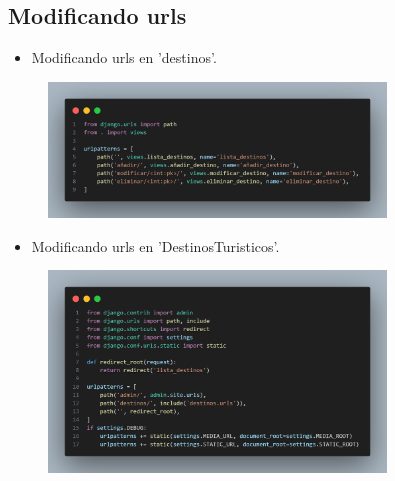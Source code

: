 \documentclass{article}
\begin{document}
	\subsection{Modificando urls}
    \begin{itemize}
		\item Modificando urls en 'destinos'.
	\end{itemize}
	\begin{figure}[H]
		\centering
		\includegraphics[width=0.8\textwidth,keepaspectratio]{img/urlsD.png}
	\end{figure}
	\begin{itemize}
		\item Modificando urls en 'DestinosTuristicos'.
	\end{itemize}
	\begin{figure}[H]
		\centering
		\includegraphics[width=0.8\textwidth,keepaspectratio]{img/urlsDT.png}
	\end{figure}
\end{document}
